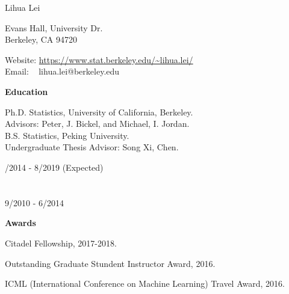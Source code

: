 \documentclass{article}
\begin{document}
\begin{Huge}
\noindent Lihua Lei
\end{Huge}

\vspace{5mm}
\begin{minipage}{0.5\linewidth}
  \flushleft
{} Evans Hall, University Dr. \\
\noindent Berkeley, CA 94720
\end{minipage}
\hfill
\begin{minipage}{0.5\linewidth}
  Website: \url{https://www.stat.berkeley.edu/~lihua.lei/}\\
  Email: \,\,\,\,\,lihua.lei@berkeley.edu
\end{minipage}

\vspace{5mm}
\begin{large}
\noindent \textbf{Education}
\end{large}
\vspace{5mm}

\begin{minipage}{0.65\linewidth}
\noindent Ph.D. Statistics, University of California, Berkeley.\\
Advisors: Peter, J. Bickel, and Michael, I. Jordan.\\

\noindent B.S. Statistics, Peking University. \\
Undergraduate Thesis Advisor: Song Xi, Chen.
\end{minipage}\hfill
\begin{minipage}{0.34\linewidth}
/2014 - 8/2019 (Expected)  \\
~\\
~\\
9/2010 - 6/2014\\
\end{minipage}

\vspace{5mm}
\begin{large}
\noindent \textbf{Awards}
\end{large}
\vspace{5mm}

Citadel Fellowship, 2017-2018.

\vspace{2mm}

Outstanding Graduate Stundent Instructor Award, 2016.

\vspace{2mm}
ICML (International Conference on Machine Learning) Travel Award, 2016.
\end{document}
